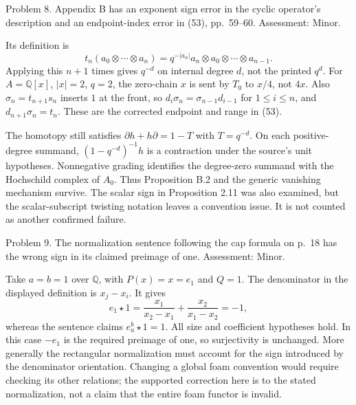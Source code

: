 \documentclass[10pt]{article}
\begin{document}
Problem 8.  Appendix B has an exponent sign error in the cyclic operator’s description and an endpoint-index error in (53), pp. 59–60. Assessment: Minor.\par
Its definition is \[t_n(a_0\otimes\cdots\otimes a_n)
   =q^{-|a_n|}a_n\otimes a_0\otimes\cdots\otimes a_{n-1}.\] Applying this \(n+1\) times gives \(q^{-d}\) on internal degree \(d\), not the printed \(q^d\). For \(A=\mathbb Q[x]\), \(|x|=2\), \(q=2\), the zero-chain \(x\) is sent by \(T_0\) to \(x/4\), not \(4x\). Also \(\sigma_n=t_{n+1}s_n\) inserts \(1\) at the front, so \(d_i\sigma_n=\sigma_{n-1}d_{i-1}\) for \(1\le i\le n\), and \(d_{n+1}\sigma_n=t_n\). These are the corrected endpoint and range in (53).\par
The homotopy still satisfies \(\partial h+h\partial=1-T\) with \(T=q^{-d}\). On each positive-degree summand, \((1-q^{-d})^{-1}h\) is a contraction under the source’s unit hypotheses. Nonnegative grading identifies the degree-zero summand with the Hochschild complex of \(A_0\). Thus Proposition B.2 and the generic vanishing mechanism survive. The scalar sign in Proposition 2.11 was also examined, but the scalar-subscript twisting notation leaves a convention issue. It is not counted as another confirmed failure.\par
Problem 9.  The normalization sentence following the cap formula on p. 18 has the wrong sign in its claimed preimage of one. Assessment: Minor.\par
Take \(a=b=1\) over \(\mathbb Q\), with \(P(x)=x=e_1\) and \(Q=1\). The denominator in the displayed definition is \(x_j-x_i\). It gives \[e_1\star1=\frac{x_1}{x_2-x_1}+
           \frac{x_2}{x_1-x_2}=-1,\] whereas the sentence claims \(e_a^b\star1=1\). All size and coefficient hypotheses hold. In this case \(-e_1\) is the required preimage of one, so surjectivity is unchanged. More generally the rectangular normalization must account for the sign introduced by the denominator orientation. Changing a global foam convention would require checking its other relations; the supported correction here is to the stated normalization, not a claim that the entire foam functor is invalid.\par
\end{document}
